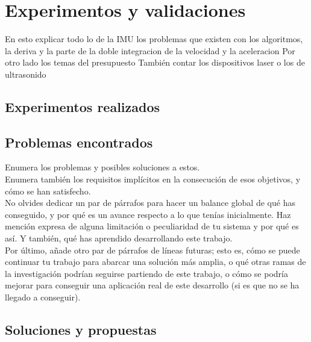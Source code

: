 \chapter{Experimentos y validaciones}
\label{cap:capitulo5}

En esto explicar todo lo de la IMU los problemas que existen con los algoritmos, la deriva y la parte de la doble integracion de la velocidad y la aceleracion
Por otro lado los temas del presupuesto
También contar los dispositivos laser o los de ultrasonido
\vspace{0.45cm}

\section{Experimentos realizados}

\section{Problemas encontrados}

Enumera los problemas y posibles soluciones a estos.\\

Enumera también los requisitos implícitos en la consecución de esos objetivos, y cómo se han satisfecho.\\

No olvides dedicar un par de párrafos para hacer un balance global de qué has conseguido, y por qué es un avance respecto a lo que tenías inicialmente. Haz mención expresa de alguna limitación o peculiaridad de tu sistema y por qué es así. Y también, qué has aprendido desarrollando este trabajo.\\

Por último, añade otro par de párrafos de líneas futuras; esto es, cómo se puede continuar tu trabajo para abarcar una solución más amplia, o qué otras ramas de la investigación podrían seguirse partiendo de este trabajo, o cómo se podría mejorar para conseguir una aplicación real de este desarrollo (si es que no se ha llegado a conseguir).

\section{Soluciones y propuestas}
